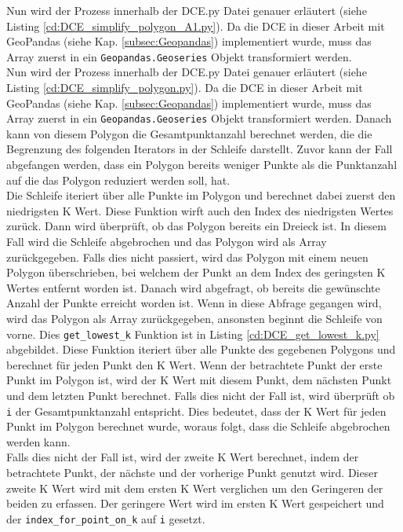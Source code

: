 {	Nun wird der Prozess innerhalb der DCE.py Datei genauer erläutert (siehe Listing \ref{cd:DCE_simplify_polygon_A1.py}). Da die DCE in dieser Arbeit mit GeoPandas (siehe Kap. \ref{subsec:Geopandas}) implementiert wurde, muss das Array zuerst in ein \lstinline|Geopandas.Geoseries| Objekt transformiert werden. \\
	Nun wird der Prozess innerhalb der DCE.py Datei genauer erläutert (siehe Listing \ref{cd:DCE_simplify_polygon.py}). Da die DCE in dieser Arbeit mit GeoPandas (siehe Kap. \ref{subsec:Geopandas}) implementiert wurde, muss das Array zuerst in ein \lstinline|Geopandas.Geoseries| Objekt transformiert werden. Danach kann von diesem Polygon die Gesamtpunktanzahl berechnet werden, die die Begrenzung des folgenden Iterators in der Schleife darstellt. Zuvor kann der Fall abgefangen werden, dass ein Polygon bereits weniger Punkte als die Punktanzahl auf die das Polygon reduziert werden soll, hat. \\
	
	Die Schleife iteriert über alle Punkte im Polygon und berechnet dabei zuerst den niedrigsten K Wert. Diese Funktion wirft auch den Index des niedrigsten Wertes zurück. Dann wird überprüft, ob das Polygon bereits ein Dreieck ist. In diesem Fall wird die Schleife abgebrochen und das Polygon wird als Array zurückgegeben. Falls dies nicht passiert, wird das Polygon mit einem neuen Polygon überschrieben, bei welchem der Punkt an dem Index des geringsten K Wertes entfernt worden ist. Danach wird abgefragt, ob bereits die gewünschte Anzahl der Punkte erreicht worden ist. Wenn in diese Abfrage gegangen wird, wird das Polygon als Array zurückgegeben, ansonsten beginnt die Schleife von vorne. 
	Dies \lstinline|get_lowest_k| Funktion ist in Listing \ref{cd:DCE_get_lowest_k.py} abgebildet. Diese Funktion iteriert über alle Punkte des gegebenen Polygons und berechnet für jeden Punkt den K Wert. Wenn der betrachtete Punkt der erste Punkt im Polygon ist, wird der K Wert mit diesem Punkt, dem nächsten Punkt und dem letzten Punkt berechnet. Falls dies nicht der Fall ist, wird überprüft ob \lstinline|i| der Gesamtpunktanzahl entspricht. Dies bedeutet, dass der K Wert für jeden Punkt im Polygon berechnet wurde, woraus folgt, dass die Schleife abgebrochen werden kann. \\
	Falls dies nicht der Fall ist, wird der zweite K Wert berechnet, indem der betrachtete Punkt, der nächste und der vorherige Punkt genutzt wird. Dieser zweite K Wert wird mit dem ersten K Wert verglichen um den Geringeren der beiden zu erfassen. Der geringere Wert wird im ersten K Wert gespeichert und der \lstinline|index_for_point_on_k| auf \lstinline|i| gesetzt. \\
}
